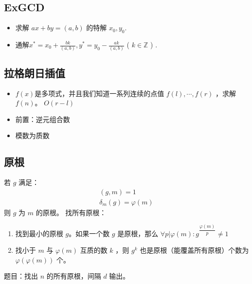 \subsection{ExGCD}
\begin{itemize}
    \item 求解 $ax+by=(a,b)$ 的特解 $x_0, y_0$.
    \item 通解$x^* = x_0+\frac{bk}{(a,b)}, y^* = y_0-\frac{ak}{(a,b)}$ ( $k \in \mathbb{Z}$ ) .
\end{itemize}

\subsection{拉格朗日插值}
\begin{itemize}
    \item $f(x)$是多项式，并且我们知道一系列连续的点值 $f(l),\cdots,f(r)$ ，求解 $f(n)$。 $O(r-l)$
    \item 前置：逆元组合数
    \item 模数为质数
\end{itemize}


\subsection{原根}
若 $g$ 满足：
\begin{equation*}
    \begin{aligned}
        (g,m)=1\\
        \delta_m(g)=\varphi(m)
    \end{aligned}
\end{equation*}
则 $g$ 为 $m$ 的原根。
找所有原根：
\begin{enumerate}
    \item 找到最小的原根 $g$。如果一个数 $g$ 是原根，那么 $\forall p|\varphi(m):g^{\dfrac{\varphi(m)}{p}}\neq1$
    \item 找小于 $m$ 与 $\varphi(m)$ 互质的数 $k$ ，则 $g^k$ 也是原根（能覆盖所有原根）个数为 $\varphi(\varphi(m))$ 个。
\end{enumerate}
题目：找出 $n$ 的所有原根，间隔 $d$ 输出。



